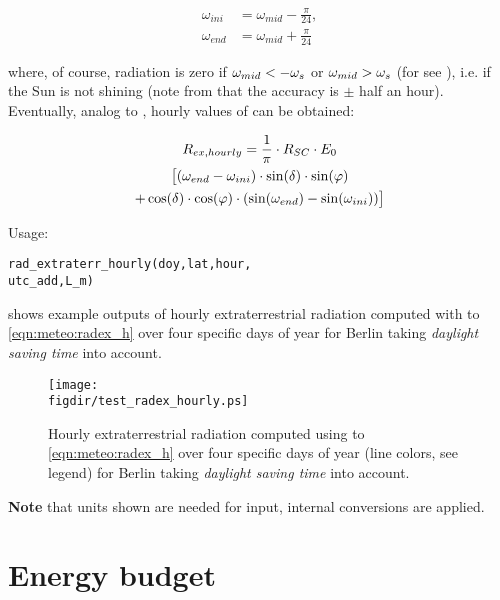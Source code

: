\begin{equation}\label{eqn:meteo:radex_h:w_ini_end}
\begin{split}
\omega_{ini} &= \omega_{mid} - \frac{\pi}{24},\\
\omega_{end} &= \omega_{mid} + \frac{\pi}{24}
\end{split}
\end{equation}

\noindent
where, of course, radiation is zero if $\omega_{mid} < -\omega_{s}{}$ or $\omega_{mid} > \omega_{s}{}$ (for \dayTimeFac{} see ), i.e. if the Sun is not shining (note from  that the accuracy is $\pm$ half an hour). Eventually, analog to \radExtraterrDaily{}, hourly values of \radExtraterr{} can be obtained:

\begin{multline}\label{eqn:meteo:radex_h}
R_{ex,hourly}{} = \frac{1}{\pi} \cdot R_{SC}{} \cdot E_{0}{}\\
\big[ (\omega_{end}-\omega_{ini}) \cdot \sin(\delta{}) \cdot \sin(\varphi{})\\
+ \cos(\delta{}) \cdot \cos(\varphi{}) \cdot (\sin(\omega_{end})-\sin(\omega_{ini})) \big]
\end{multline}

\noindent
Usage:
\begin{verbatim}
rad_extraterr_hourly(doy,lat,hour,
utc_add,L_m)
\end{verbatim}

 shows example outputs of hourly extraterrestrial radiation computed with  to \ref{eqn:meteo:radex_h} over four specific days of year for Berlin taking \emph{daylight saving time} into account.

\begin{figure}
  \centering
  \texttt{[image: \\figdir/test\_radex\_hourly.ps]}
  \caption{Hourly extraterrestrial radiation computed using  to \ref{eqn:meteo:radex_h} over four specific days of year (line colors, see legend) for Berlin taking \emph{daylight saving time} into account.\label{fig:meteo:radex_h}}
\end{figure}

\textbf{Note} that units shown are needed for input, internal conversions are applied.


\section{Energy budget}

